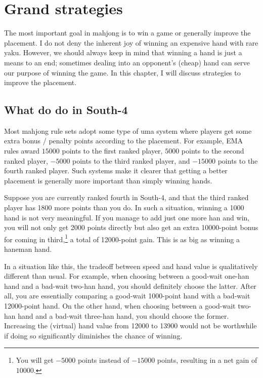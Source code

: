 
\chapter{Grand strategies} \label{ch:grand}
\thispagestyle{empty}
The most important goal in mahjong is to win a game or generally improve the placement. I do not deny the inherent joy of winning an expensive hand with rare {\jap yaku}. However, we should always keep in mind that winning a hand is just a means to an end; sometimes dealing into an opponent's (cheap) hand can serve our purpose of winning the game. 
In this chapter, I will discuss strategies to improve the placement.

\section{What do do in South-4}
Most mahjong rule sets adopt some type of {\jap uma} system where players get some extra bonus / penalty points according to the placement. For example, EMA rules award $15000$ points to the first ranked player, $5000$ points to the second ranked player, $-5000$ points to the third ranked player, and $-15000$ points to the fourth ranked player. 
Such systems make it clearer that getting a better placement is generally more important than simply winning hands. 

\bigskip
Suppose you are currently ranked fourth in South-4, and that the third ranked player has 1800 more points than you do. In such a situation, winning a 1000 hand is not very meaningful. If you manage to add just one more {\jap han} and win, you will not only get 2000 points directly but also get an extra 10000-point bonus for coming in third,\footnote{You will get $-5000$ points instead of $-15000$ points, resulting in a net gain of $10000$.} a total of 12000-point gain. This is as big as winning a {\jap haneman} hand. 

\bigskip
In a situation like this, the tradeoff between speed and hand value is qualitatively different than usual. For example, when choosing between a good-wait one-{\jap han} hand and a bad-wait two-{\jap han} hand, you should definitely choose the latter. After all, you are essentially comparing a good-wait 1000-point hand with a bad-wait 12000-point hand. On the other hand, when choosing between a good-wait two-{\jap han} hand and a bad-wait three-{\jap han} hand, you should choose the former. Increasing the (virtual) hand value from 12000 to 13900 would not be worthwhile if doing so significantly diminishes the chance of winning. 

